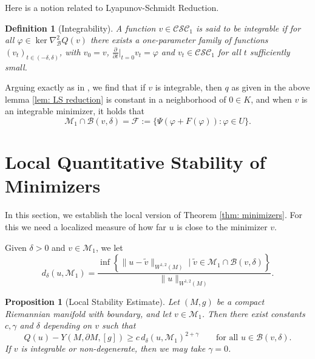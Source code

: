\documentclass[12pt]{amsart}
\newtheorem{proposition}[theorem]{Proposition}
\newtheorem{definition}[theorem]{Definition}
\newcommand{\g}{{\gamma}}
\newcommand{\M}{{\mathcal{M}}}
\newcommand{\vphi}{\varphi}
\newcommand{\B}{\mathcal{B}}
\begin{document}
Here is a notion related to Lyapunov-Schmidt Reduction.
\begin{definition}[Integrability]\label{def: int} {\rm
	A function $v \in \mathcal{CSC}_1$ is said to be {\it integrable} if for all $\vphi \in \ker \nabla^2_\B Q(v)$ there exists a one-parameter family of functions $(v_t)_{t\in (-\delta,\delta)}$, with $v_0 = v$, $\frac{\partial}{\partial t}\big|_{t=0}v_t = \vphi $ and $v_t \in \mathcal{CSC}_1$ for all $t$ sufficiently small.
	}
\end{definition}

Arguing exactly as in \cite{ENL22}, we find that if $v$ is integrable, then $q$ as
given in the above lemma \ref{lem: LS reduction} is constant in a neighborhood of
$0\in K$, and when $v$ is an integrable minimizer, it holds that 
\begin{equation}
    \M_1 \cap \B(v,\delta) = \mathcal{F}:=\{\Psi(\vphi +F(\vphi)) : \vphi \in U\}.
\end{equation}



\section{Local Quantitative Stability of Minimizers}\label{s:localstability}
 In this section, we establish the local version of Theorem \ref{thm: minimizers}.
 For this we need a localized measure of how far $u$ is close to the minimizer $v$.


Given $\delta >0$ and $v \in \mathcal{M}_1$, %
we let 
\[
d_\delta(u , \mathcal{M}_1) = \frac{\inf\left\{ \| u -\tilde{v}\|_{W^{1,2}(M)} \mid \tilde{v} \in \mathcal{M}_1\cap \B(v,\delta)\right\}}{\|u\|_{W^{1,2}(M)}}.
\]

 
\begin{proposition}[Local Stability Estimate]\label{lem: Fuglede}
	Let $(M,g)$ be a compact  Riemannian manifold with boundary, and let $v \in \M_1$. Then there exist constants $c, \g$ and $\delta$ depending on $v$ such that 
	\begin{equation}\label{e: Fuglede}
		Q(u) - Y(M,\partial M, [g]) \geq c \,d_\delta(u, \mathcal{M}_1)^{2+\g}\qquad  \text{for all } u \in \B(v,\delta).
			\end{equation}
	If  $v$ is integrable or non-degenerate, then we may take $\g=0$.  
\end{proposition}
\end{document}

